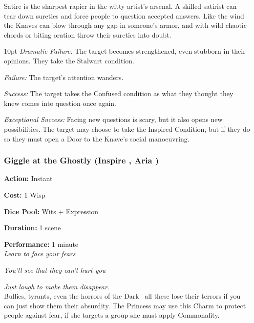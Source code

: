 \noindent Satire is the sharpest rapier in the witty artist's arsenal. A skilled satirist can tear down sureties and force people to question accepted answers. Like the wind the Knaves can blow through any gap in someone's armor, and with wild chaotic chords or biting oration throw their sureties into doubt. 

\begin{myindentpar}{10pt}    \emph{Dramatic Failure:} The target becomes strengthened, even stubborn in their opinions. They take the Stalwart condition. 

    \emph{Failure:} The target’s attention wanders.

    \emph{Success:} The target takes the Confused condition as what they thought they knew comes into question once again.

    \emph{Exceptional Success:} Facing new questions is scary, but it also opens new possibilities. The target may choose to take the Inspired Condition, but if they do so they must open a Door to the Knave's social manoeuvring. 

\end{myindentpar}

\subsubsection*{Giggle at the Ghostly (Inspire \textbullet\textbullet, Aria \textbullet)}

\noindent \textbf{Action:} Instant

\noindent \textbf{Cost:} 1 Wisp

\noindent \textbf{Dice Pool:} Wits + Expression 

\noindent \textbf{Duration:} 1 scene 

\noindent \textbf{Performance:} 1 minute \\	

\textit{Learn to face your fears}

\textit{You'll see that they can't hurt you}

\textit{Just laugh to make them disappear.} \\

\noindent Bullies, tyrants, even the horrors of the Dark \textendash\, all these lose their terrors if you can just show them their absurdity. The Princess may use this Charm to protect people against fear, if she targets a group she must apply Commonality. 

